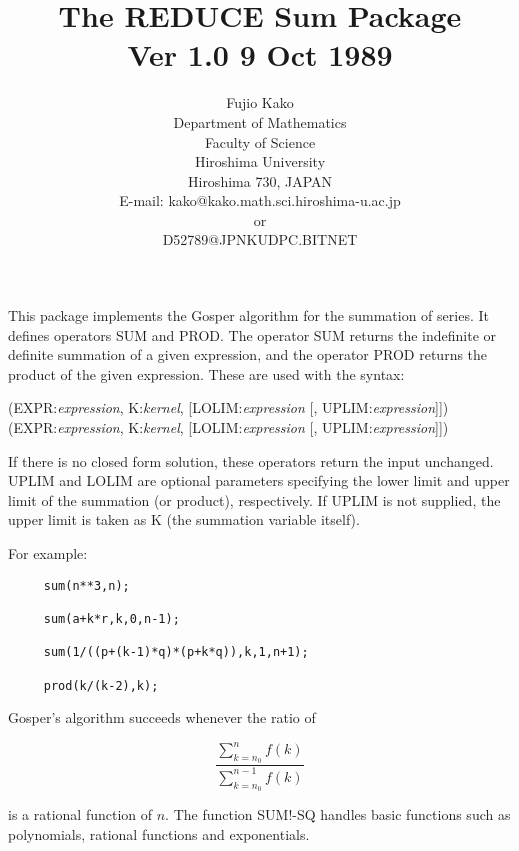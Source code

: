 \title{The REDUCE Sum Package \\ Ver 1.0 9 Oct 1989}
\date{}
\author{Fujio Kako \\ Department of Mathematics \\ Faculty of Science \\
Hiroshima University \\ Hiroshima 730, JAPAN \\
E-mail: kako@kako.math.sci.hiroshima-u.ac.jp \\ or \\
D52789@JPNKUDPC.BITNET}

\maketitle
{}  
This package implements the Gosper algorithm for the summation of series.
It defines operators SUM and PROD.  The operator SUM returns the indefinite
or definite summation of a given expression, and the operator PROD returns
the product of the given expression.  These are used with the syntax:

\vspace{.1in}
(EXPR:{\em expression}, K:{\em kernel},
[LOLIM:{\em expression} [, UPLIM:{\em expression}]])
\vspace{.1in}
(EXPR:{\em expression}, K:{\em kernel},
[LOLIM:{\em expression} [, UPLIM:{\em expression}]])

If there is no closed form solution, these operators return the input
unchanged.  UPLIM and LOLIM are optional parameters specifying the lower
limit and upper limit of the summation (or product), respectively.  If UPLIM
is not supplied, the upper limit is taken as K (the summation variable
itself).

For example:

\begin{verbatim}
     sum(n**3,n);

     sum(a+k*r,k,0,n-1);

     sum(1/((p+(k-1)*q)*(p+k*q)),k,1,n+1);

     prod(k/(k-2),k);
\end{verbatim}

Gosper's algorithm succeeds whenever the ratio of

\[ \frac{\sum_{k=n_0}^n f(k)}{\sum_{k=n_0}^{n-1} f(k)} \]

\noindent is a rational function of $n$.  The function SUM!-SQ
handles basic functions such as polynomials, rational functions and
exponentials. 

